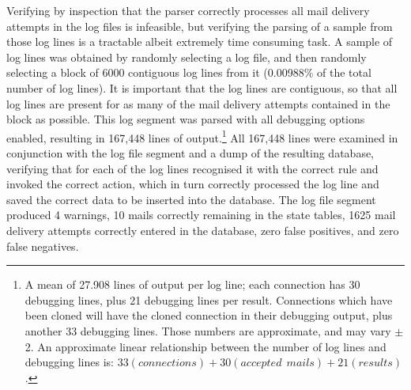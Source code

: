 
Verifying by inspection that the parser correctly processes all
\numberOFconnectionsINlogFILES{} mail delivery attempts in the
\numberOFlogFILES{} log files is infeasible, but verifying the parsing of a
sample from those log lines is a tractable albeit extremely time consuming
task.  A sample of log lines was obtained by randomly selecting a log file,
and then randomly selecting a block of 6000 contiguous log lines from it
(0.00988\% of the total number of log lines).  It is important that the log
lines are contiguous, so that all log lines are present for as many of the
mail delivery attempts contained in the block as possible.  This log
segment was parsed with all debugging options enabled, resulting in 167,448
lines of output.\footnote{A mean of 27.908 lines of output per log line;
each connection has 30 debugging lines, plus 21 debugging lines per result.
Connections which have been cloned will have the cloned connection in their
debugging output, plus another 33 debugging lines.  Those numbers are
approximate, and may vary $\pm{}$ 2.  An approximate linear relationship
between the number of log lines and debugging lines is: $33(connections) +
30(accepted~~mails) + 21(results)$.} All 167,448 lines were examined in
conjunction with the log file segment and a dump of the resulting database,
verifying that for each of the log lines \parsername{} recognised it with
the correct rule and invoked the correct action, which in turn correctly
processed the log line and saved the correct data to be inserted into the
database.  The log file segment produced 4 warnings, 10 mails correctly
remaining in the state tables, 1625 mail delivery attempts correctly
entered in the database, zero false positives, and zero false negatives.

